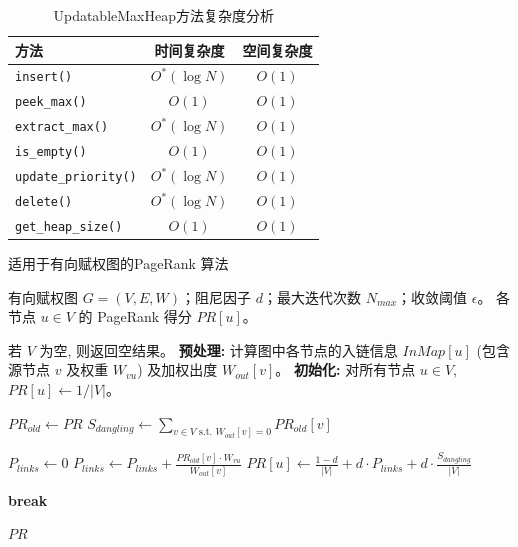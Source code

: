 \documentclass[cn,hazy,blue,10pt,normal]{elegantnote}
\begin{document}
\begin{table}[t]
    \centering
    \caption{UpdatableMaxHeap方法复杂度分析}
    \label{tab: heap_complexity}
    \begin{tabular}{lcc}
    \toprule
    方法  & 时间复杂度  & 空间复杂度  \\
    \midrule
    \texttt{insert()} & $O^*(\log N)$ & $O(1)$ \\
    \texttt{peek\_max()} & $O(1)$ & $O(1)$ \\
    \texttt{extract\_max()} & $O^*(\log N)$ & $O(1)$ \\
    \texttt{is\_empty()} & $O(1)$ & $O(1)$ \\
    \texttt{update\_priority()} & $O^*(\log N)$ & $O(1)$ \\
    \texttt{delete()} & $O^*(\log N)$ & $O(1)$ \\
    \texttt{get\_heap\_size()} & $O(1)$ & $O(1)$ \\
    \bottomrule
    \end{tabular}
\end{table}

\begin{algorithm}[t]
\caption{适用于有向赋权图的PageRank 算法}
\label{alg:weighted_pagerank}
\begin{algorithmic}[1]
\Require 有向赋权图 $G=(V, E, W)$；阻尼因子 $d$；最大迭代次数 $N_{max}$；收敛阈值 $\epsilon$。
\Ensure 各节点 $u \in V$ 的 PageRank 得分 $PR[u]$。

\State 若 $V$ 为空, 则返回空结果。
\State \textbf{预处理:} 计算图中各节点的入链信息 $InMap[u]$ (包含源节点 $v$ 及权重 $W_{vu}$) 及加权出度 $W_{out}[v]$。
\State \textbf{初始化:} 对所有节点 $u \in V$, $PR[u] \leftarrow 1 / |V|$。

    \State $PR_{old} \leftarrow PR$
    \State $S_{dangling} \leftarrow \sum_{v \in V \text{ s.t. } W_{out}[v]=0} PR_{old}[v]$ 
    
        \State $P_{links} \leftarrow 0$
                    \State $P_{links} \leftarrow P_{links} + \frac{PR_{old}[v] \cdot W_{vu}}{W_{out}[v]}$
                \EndIf
            \EndFor
        \EndIf
        \State $PR[u] \leftarrow \frac{1-d}{|V|} + d \cdot P_{links} + d \cdot \frac{S_{dangling}}{|V|}$
    \EndFor
    
        \State \textbf{break} 
    \EndIf
\EndFor

\State \Return $PR$
\end{algorithmic}
\end{algorithm}
\end{document}
